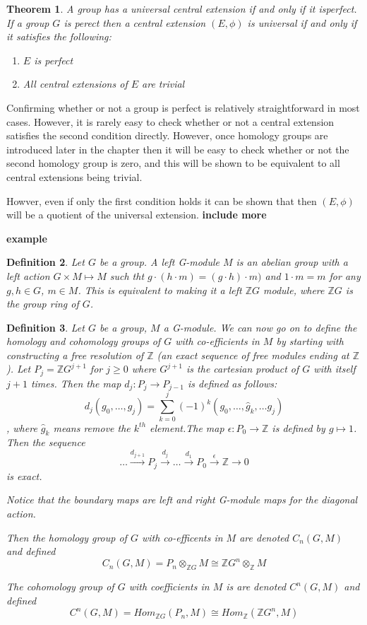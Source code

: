 \documentclass[a4paper,10pt]{article}
\newtheorem{thm}{Theorem}[subsection]
\newtheorem{defn}[thm]{Definition}
\begin{document}
\begin{thm}
A group has a universal central extension if and only if it isperfect. If a group $G$ is perect then a central extension $(E,\phi)$ is universal if and only if it satisfies the following:
\begin{enumerate}
 \item $E$ is perfect
 \item All central extensions of $E$ are trivial
\end{enumerate}
\end{thm}

Confirming whether or not a group is perfect is relatively straightforward in most cases. However, it is rarely easy to check whether or not a central extension satisfies the second condition directly. However, once homology groups are introduced later in the chapter then it will be easy to check whether or not the second homology group is zero, and this will be shown to be equivalent to all central extensions being trivial.

Howver, even if only the first condition holds it can be shown that then $(E,\phi)$ will be a quotient of the universal extension.
\textbf{include more}

\textbf{example}

\begin{defn}
Let $G$ be a group. A left G-module $M$ is an abelian group with a left action $G\times M\mapsto M$ such tht $g\cdot (h\cdot m)=(g\cdot h)\cdot m)$ and $1\cdot m=m$ for any $g,h\in G$, $m\in M$. This is equivalent to making it a left $\mathbb{Z}G$ module, where $\mathbb{Z}G$ is the group ring of $G$.
\end{defn}

\begin{defn}
Let $G$ be a group, $M$ a G-module. We can now go on to define the homology and cohomology  groups of $G$ with co-efficients in $M$ by starting with constructing a free resolution of $\mathbb{Z}$ (an exact sequence of free modules ending at $\mathbb{Z}$). Let $P_{j}=\mathbb{Z}G^{j+1}$ for $j\geq 0$ where $G^{j+1}$ is the cartesian product of $G$ with itself $j+1$ times. Then the map $d_{j}:P_{j}\rightarrow P_{j-1}$ is defined as follows: $$d_{j}(g_{0},\ldots ,g_{j})=\sum_{k=0}^{j}(-1)^{k}(g_{0},\ldots ,\hat{g}_{k},\ldots g_{j})$$, where $\hat{g}_{k}$ means remove the $k^{th}$ element.The map $\epsilon: P_{0}\rightarrow \mathbb{Z}$ is defined by $g\mapsto 1$. Then the sequence $$\ldots \stackrel{d_{j+1}}{\rightarrow} P_{j} \stackrel{d_{j}}{\rightarrow} \ldots \stackrel{d_{1}}{\rightarrow} P_{0} \stackrel{\epsilon}{\rightarrow} \mathbb{Z} \rightarrow 0$$ is exact.

Notice that the boundary maps are left and right G-module maps for the diagonal action. 

Then the homology group of $G$ with co-efficents in $M$ are denoted $C_{n}(G,M)$ and defined $$C_{n}(G,M)=P_{n}\otimes_{\mathbb{Z}G}M\cong \mathbb{Z}G^{n}\otimes_{\mathbb{Z}}M$$

The cohomology group of $G$ with coefficients in $M$ is are denoted $C^{n}(G,M)$ and defined $$C^{n}(G,M)=Hom_{\mathbb{Z}G}(P_{n},M)\cong Hom_{\mathbb{Z}}(\mathbb{Z}G^{n},M)$$
\end{defn}
\end{document}
